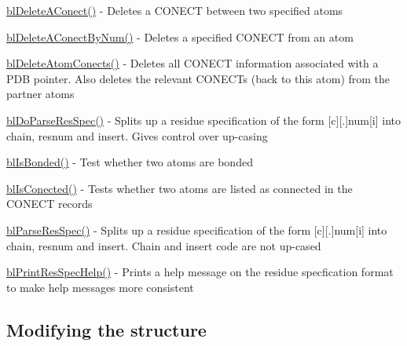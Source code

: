 \begin{DoxyItemize}
\item \hyperlink{_build_conect_8c_abd54e33bfb576571519fc3401f33130d}{bl\-Delete\-A\-Conect()} -\/ Deletes a C\-O\-N\-E\-C\-T between two specified atoms
\item \hyperlink{_build_conect_8c_a3d570db9fecbdfeeb93c1fa3e8bff7be}{bl\-Delete\-A\-Conect\-By\-Num()} -\/ Deletes a specified C\-O\-N\-E\-C\-T from an atom
\item \hyperlink{_build_conect_8c_a281d38064920101079573bae40110db2}{bl\-Delete\-Atom\-Conects()} -\/ Deletes all C\-O\-N\-E\-C\-T information associated with a P\-D\-B pointer. Also deletes the relevant C\-O\-N\-E\-C\-Ts (back to this atom) from the partner atoms
\item \hyperlink{_parse_res_8c_abe7cc01e0efdffe4123714245c470d5c}{bl\-Do\-Parse\-Res\-Spec()} -\/ Splits up a residue specification of the form \mbox{[}c\mbox{]}\mbox{[}.\mbox{]}num\mbox{[}i\mbox{]} into chain, resnum and insert. Gives control over up-\/casing
\item \hyperlink{_build_conect_8c_a3b284b864280268928f5fc7944026a7d}{bl\-Is\-Bonded()} -\/ Test whether two atoms are bonded
\item \hyperlink{_build_conect_8c_aad98df699dfad286bf64dfa139f05bdf}{bl\-Is\-Conected()} -\/ Tests whether two atoms are listed as connected in the C\-O\-N\-E\-C\-T records
\item \hyperlink{_parse_res_8c_ae13d973e92945be6cc5de8fad4bccc3a}{bl\-Parse\-Res\-Spec()} -\/ Splits up a residue specification of the form \mbox{[}c\mbox{]}\mbox{[}.\mbox{]}num\mbox{[}i\mbox{]} into chain, resnum and insert. Chain and insert code are not up-\/cased
\item \hyperlink{_parse_res_8c_a5a60170067d646a00d722d4be6a33fa6}{bl\-Print\-Res\-Spec\-Help()} -\/ Prints a help message on the residue specfication format to make help messages more consistent
\end{DoxyItemize}

\subsection*{Modifying the structure }


